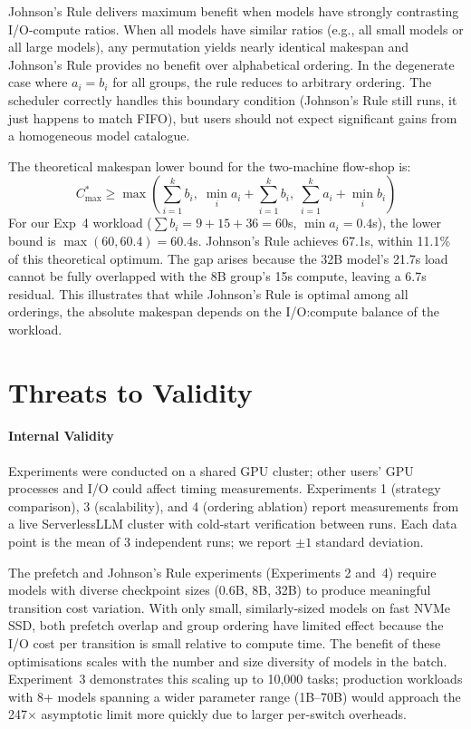 \documentclass[logo,bsc,singlespacing,parskip,online]{infthesis}
\begin{document}
Johnson's Rule delivers maximum benefit when models have strongly contrasting I/O-compute ratios. When all models have similar ratios (e.g., all small models or all large models), any permutation yields nearly identical makespan and Johnson's Rule provides no benefit over alphabetical ordering. In the degenerate case where $a_i = b_i$ for all groups, the rule reduces to arbitrary ordering. The scheduler correctly handles this boundary condition (Johnson's Rule still runs, it just happens to match FIFO), but users should not expect significant gains from a homogeneous model catalogue.

The theoretical makespan lower bound for the two-machine flow-shop is:
$$C_{\max}^* \geq \max\left(\sum_{i=1}^k b_i,\; \min_i a_i + \sum_{i=1}^k b_i,\; \sum_{i=1}^k a_i + \min_i b_i\right)$$
For our Exp~4 workload ($\sum b_i = 9+15+36 = 60$s, $\min a_i = 0.4$s), the lower bound is $\max(60, 60.4) = 60.4$s. Johnson's Rule achieves 67.1s, within 11.1\% of this theoretical optimum. The gap arises because the 32B model's 21.7s load cannot be fully overlapped with the 8B group's 15s compute, leaving a 6.7s residual. This illustrates that while Johnson's Rule is optimal among all orderings, the absolute makespan depends on the I/O:compute balance of the workload.

\section{Threats to Validity}

\paragraph{Internal Validity}
Experiments were conducted on a shared GPU cluster; other users' GPU processes and I/O could affect timing measurements. Experiments 1 (strategy comparison), 3 (scalability), and 4 (ordering ablation) report measurements from a live ServerlessLLM cluster with cold-start verification between runs. Each data point is the mean of 3 independent runs; we report $\pm 1$ standard deviation.

The prefetch and Johnson's Rule experiments (Experiments 2 and~4) require models with diverse checkpoint sizes (0.6B, 8B, 32B) to produce meaningful transition cost variation. With only small, similarly-sized models on fast NVMe SSD, both prefetch overlap and group ordering have limited effect because the I/O cost per transition is small relative to compute time. The benefit of these optimisations scales with the number and size diversity of models in the batch. Experiment~3 demonstrates this scaling up to 10,000 tasks; production workloads with 8+ models spanning a wider parameter range (1B--70B) would approach the 247$\times$ asymptotic limit more quickly due to larger per-switch overheads.
\end{document}

